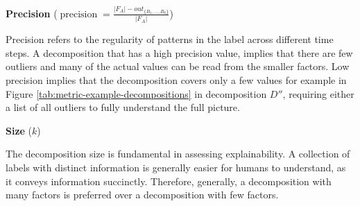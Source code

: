 \textbf{Precision} ($\operatorname{precision} = \frac{|F_A| - out_{\{B_1,\dots,B_k\}}}{|F_A|}$)

Precision refers to the regularity of patterns in the label across different time steps.
A decomposition that has a high precision value, implies that there are few outliers and many of the actual values can be read from the smaller factors.
Low precision implies that the decomposition covers only a few values for example in Figure \ref{tab:metric-example-decompositions} in decomposition $D''$, requiring either a list of all outliers to fully understand the full picture.

\textbf{Size} ($k$)

The decomposition size is fundamental in assessing explainability.
A collection of labels with distinct information is generally easier for humans to understand, as it conveys information succinctly.
Therefore, generally, a decomposition with many factors is preferred over a decomposition with few factors.

